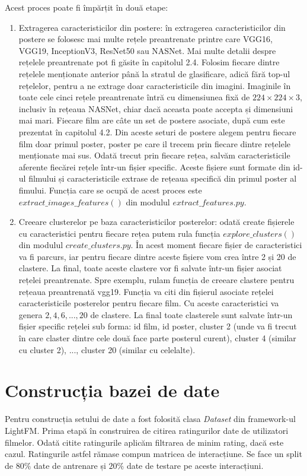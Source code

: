 Acest proces poate fi împărțit în două etape:
\begin{enumerate}
	\item Extragerea caracteristicilor din postere: în extragerea caracteristicilor din postere se folosesc mai multe rețele preantrenate printre care VGG16, VGG19, InceptionV3, ResNet50 sau NASNet. Mai multe detalii despre rețelele preantrenate pot fi găsite în capitolul 2.4. Folosim fiecare dintre rețelele menționate anterior până la stratul de glasificare, adică fără top-ul rețelelor, pentru a ne extrage doar caracteristicile din imagini. Imaginile în toate cele cinci rețele preantrenate întră cu dimensiunea fixă de $224 \times 224 \times 3$, inclusiv în rețeaua NASNet, chiar dacă aceasta poate accepta și dimensiuni mai mari. Fiecare film are câte un set de postere asociate, după cum este prezentat în capitolul 4.2. Din aceste seturi de postere alegem pentru fiecare film doar primul poster, poster pe care il trecem prin fiecare dintre rețelele menționate mai sus. Odată trecut prin fiecare rețea, salvăm caracteristicile aferente fiecărei rețele într-un fișier specific. Aceste fișiere sunt formate din id-ul filmului și caracteristicile extrase de rețeaua specifică din primul poster al fimului.
Funcția care se ocupă de acest proces este $extract\_images\_features()$ din modulul $extract\_features.py$.
	\item Creeare clusterelor pe baza caracteristicilor posterelor: odată create fișierele cu caracteristici pentru fiecare rețea putem rula funcția $explore\_clusters()$ din modulul $create\_clusters.py$. În acest moment fiecare fișier de caracteristici va fi parcurs, iar pentru fiecare dintre aceste fișiere vom crea între 2 și 20 de clastere. La final, toate aceste clastere vor fi salvate într-un fișier asociat rețelei preantrenate. Spre exemplu, rulam funcția de creeare clastere pentru rețeaua preantrenată vgg19. Funcția va citi din fișierul asociate rețelei caracteristicile posterelor pentru fiecare film. Cu aceste caracteristici va genera $2, 4, 6, ..., 20$ de clastere. La final toate clasterele sunt salvate într-un fișier specific rețelei sub forma: id film, id poster, cluster 2 (unde va fi trecut în care claster dintre cele două face parte posterul curent), cluster 4 (similar cu cluster 2), ..., cluster 20 (similar cu celelalte).
\end{enumerate}

\section{Construcția bazei de date}
Pentru construcția setului de date a fost folosită clasa \textit{Dataset} din framework-ul LightFM. Prima etapă în construirea de citirea ratingurilor date de utilizatori filmelor. Odată citite ratingurile aplicăm filtrarea de minim rating, dacă este cazul. Ratingurile astfel rămase compun matricea de interacțiune. Se face un split de $80\%$ date de antrenare și $20\%$ date de testare pe aceste interacțiuni.

